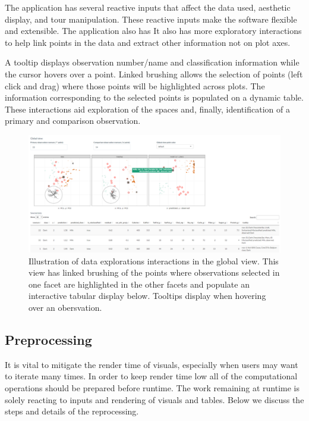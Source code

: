 \documentclass[
  article]{article}
\begin{document}
The application has several reactive inputs that affect the data used, aesthetic display, and tour manipulation. These reactive inputs make the software flexible and extensible. The application also has It also has more exploratory interactions to help link points in the data and extract other information not on plot axes.

A tooltip displays observation number/name and classification information while the cursor hovers over a point. Linked brushing allows the selection of points (left click and drag) where those points will be highlighted across plots. The information corresponding to the selected points is populated on a dynamic table. These interactions aid exploration of the spaces and, finally, identification of a primary and comparison observation.

\begin{figure}

{\centering \includegraphics[width=1\linewidth]{./figures/app_interactions} 

}

\caption{Illustration of data explorations interactions in the global view. This view has linked brushing of the points where observations selected in one facet are highlighted in the other facets and populate an interactive tabular display below. Tooltips display when hovering over an obersvation.}\label{fig:interactions}
\end{figure}

\hypertarget{preprocessing}{%
\subsection{Preprocessing}\label{preprocessing}}

It is vital to mitigate the render time of visuals, especially when users may want to iterate many times. In order to keep render time low all of the computational operations should be prepared before runtime. The work remaining at runtime is solely reacting to inputs and rendering of visuals and tables. Below we discuss the steps and details of the reprocessing.
\end{document}
